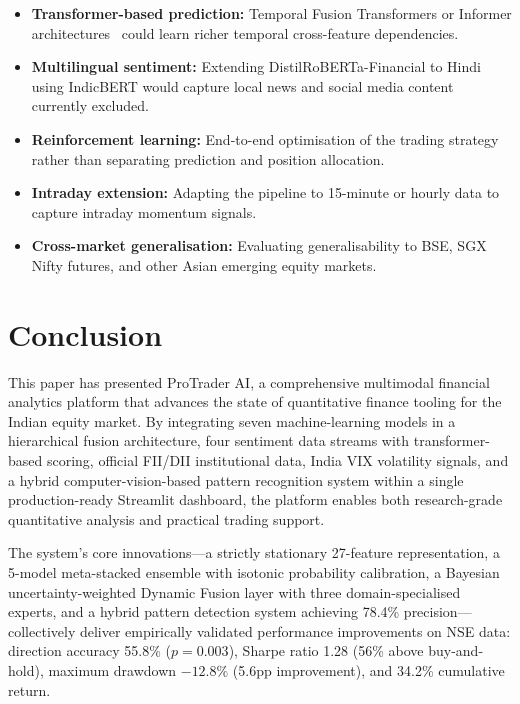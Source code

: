 \documentclass[10pt,a4paper,twoside]{article}
\begin{document}
\begin{itemize}
\item \textbf{Transformer-based prediction:} Temporal Fusion Transformers or
  Informer architectures~\cite{vaswani2017} could learn richer temporal
  cross-feature dependencies.
\item \textbf{Multilingual sentiment:} Extending DistilRoBERTa-Financial to
  Hindi using IndicBERT would capture local news and social media content
  currently excluded.
\item \textbf{Reinforcement learning:} End-to-end optimisation of the trading
  strategy rather than separating prediction and position allocation.
\item \textbf{Intraday extension:} Adapting the pipeline to 15-minute or
  hourly data to capture intraday momentum signals.
\item \textbf{Cross-market generalisation:} Evaluating generalisability to
  BSE, SGX Nifty futures, and other Asian emerging equity markets.
\end{itemize}

\section{Conclusion}

This paper has presented ProTrader AI, a comprehensive multimodal financial
analytics platform that advances the state of quantitative finance tooling for
the Indian equity market. By integrating seven machine-learning models in a
hierarchical fusion architecture, four sentiment data streams with transformer-based
scoring, official FII/DII institutional data, India VIX volatility signals,
and a hybrid computer-vision-based pattern recognition system within a single
production-ready Streamlit dashboard, the platform enables both research-grade
quantitative analysis and practical trading support.

The system's core innovations---a strictly stationary 27-feature representation,
a 5-model meta-stacked ensemble with isotonic probability calibration, a
Bayesian uncertainty-weighted Dynamic Fusion layer with three domain-specialised
experts, and a hybrid pattern detection system achieving 78.4\% precision---collectively
deliver empirically validated performance improvements on NSE data: direction
accuracy 55.8\% ($p = 0.003$), Sharpe ratio 1.28 (56\% above buy-and-hold),
maximum drawdown $-12.8\%$ (5.6pp improvement), and 34.2\% cumulative return.
\end{document}

